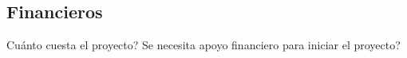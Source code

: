 \subsection{Financieros}
Cuánto cuesta el proyecto?
Se necesita apoyo financiero para iniciar el proyecto?